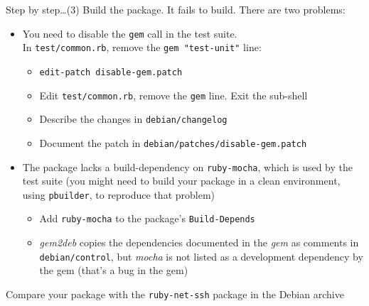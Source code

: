 \documentclass[10pt,final]{beamer}
\begin{document}
\begin{frame}[fragile=singleslide]{Step by step\ldots (3)}
Build the package.
It fails to build. There are two problems:
\begin{itemize}
	\item You need to disable the \texttt{gem} call in the test suite.\\
	In \texttt{test/common.rb}, remove the \verb+gem "test-unit"+ line:
		\begin{itemize}
			\item \texttt{edit-patch disable-gem.patch}
			\item Edit \texttt{test/common.rb}, remove the \texttt{gem} line. Exit the sub-shell
			\item Describe the changes in \texttt{debian/changelog}
			\item Document the patch in \texttt{debian/patches/disable-gem.patch}
		\end{itemize}
		\hbr

	\item The package lacks a build-dependency on \texttt{ruby-mocha},
		which is used by the test suite (you might need to build your
		package in a clean environment, using \texttt{pbuilder}, to
		reproduce that problem)

		\begin{itemize}
			\item Add \texttt{ruby-mocha} to the package's \texttt{Build-Depends}

			\item \textsl{gem2deb} copies the dependencies
				documented in the \textsl{gem} as comments in
				\texttt{debian/control}, but \textsl{mocha} is
				not listed as a development dependency by the
				gem (that's a bug in the gem)
		\end{itemize}
\end{itemize}
\hbr
Compare your package with the \texttt{ruby-net-ssh} package in the Debian archive
\end{frame}
\end{document}
